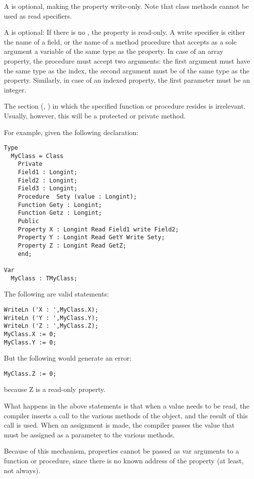 A  is optional, making the property write-only.
Note that class methods cannot be used as read specifiers.

A   is optional: If there is no , the
property is read-only. A write specifier is either the name of a field, or
the name of a method procedure that accepts as a sole argument a variable of
the same type as the property. In case of an array property, the procedure
must accept two arguments: the first argument must have the same type as the
index, the second argument must be of the same type as the property.
Similarly, in case of an indexed property, the first parameter must be an integer.

The section  (, )
in which the specified function or procedure resides is irrelevant. Usually,
however, this will be a protected or private method.

For example, given the following declaration:
\begin{verbatim}
Type
  MyClass = Class
    Private
    Field1 : Longint;
    Field2 : Longint;
    Field3 : Longint;
    Procedure  Sety (value : Longint);
    Function Gety : Longint;
    Function Getz : Longint;
    Public
    Property X : Longint Read Field1 write Field2;
    Property Y : Longint Read GetY Write Sety;
    Property Z : Longint Read GetZ;
    end;

Var
  MyClass : TMyClass;
\end{verbatim}
The following are valid statements:
\begin{verbatim}
WriteLn ('X : ',MyClass.X);
WriteLn ('Y : ',MyClass.Y);
WriteLn ('Z : ',MyClass.Z);
MyClass.X := 0;
MyClass.Y := 0;
\end{verbatim}
But the following would generate an error:
\begin{verbatim}
MyClass.Z := 0;
\end{verbatim}
because Z is a read-only property.

What happens in the above statements is that when a value needs to be read,
the compiler inserts a call to the various  methods of the
object, and the result of this call is used. When an assignment is made,
the compiler passes the value that must be assigned as a parameter to
the various  methods.

Because of this mechanism, properties cannot be passed as var arguments to a
function or procedure, since there is no known address of the property (at
least, not always).

